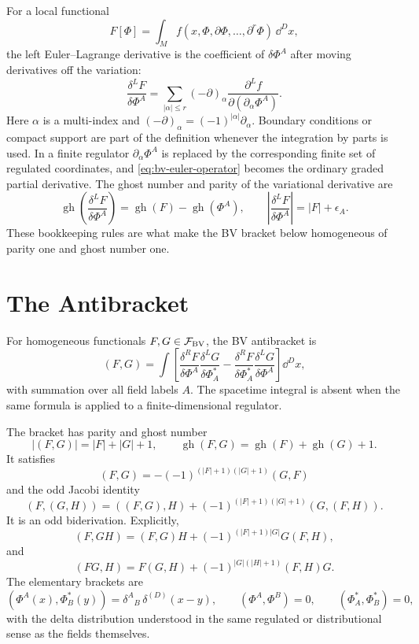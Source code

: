 For a local functional
\[
  F[\Phi]=\int_M f(x,\Phi,\partial\Phi,\ldots,\partial^r\Phi)\,\dd^D x ,
\]
the left Euler--Lagrange derivative is the coefficient of
\(\delta\Phi^A\) after moving derivatives off the variation:
\begin{equation}
  \frac{\delta^L F}{\delta\Phi^A}
  =
  \sum_{|\alpha|\leq r}
  (-\partial)_\alpha
  \frac{\partial^L f}
       {\partial(\partial_\alpha\Phi^A)} .
  \label{eq:bv-euler-operator}
\end{equation}
Here \(\alpha\) is a multi-index and
\((-\partial)_\alpha=(-1)^{|\alpha|}\partial_\alpha\).  Boundary conditions or
compact support are part of the definition whenever the integration by parts
is used.  In a finite regulator \(\partial_\alpha\Phi^A\) is replaced by the
corresponding finite set of regulated coordinates, and
\eqref{eq:bv-euler-operator} becomes the ordinary graded partial derivative.
The ghost number and parity of the variational derivative are
\[
  \operatorname{gh}\!\left(\frac{\delta^L F}{\delta\Phi^A}\right)
  =
  \operatorname{gh}(F)-\operatorname{gh}(\Phi^A),
  \qquad
  \left|\frac{\delta^L F}{\delta\Phi^A}\right|
  =
  |F|+\epsilon_A .
\]
These bookkeeping rules are what make the BV bracket below homogeneous of
parity one and ghost number one.

\section{The Antibracket}

\begin{definition}[BV antibracket]
For homogeneous functionals \(F,G\in\mathcal F_{\rm BV}\), the BV
antibracket is
\begin{equation}
  (F,G)
  =
  \int
  \left[
  \frac{\delta^R F}{\delta\Phi^A}
  \frac{\delta^L G}{\delta\Phi^*_A}
  -
  \frac{\delta^R F}{\delta\Phi^*_A}
  \frac{\delta^L G}{\delta\Phi^A}
  \right]\dd^D x ,
  \label{eq:bv-antibracket}
\end{equation}
with summation over all field labels \(A\).  The spacetime integral is absent
when the same formula is applied to a finite-dimensional regulator.
\end{definition}

The bracket has parity and ghost number
\[
  |(F,G)|=|F|+|G|+1,
  \qquad
  \operatorname{gh}(F,G)=\operatorname{gh}(F)+\operatorname{gh}(G)+1.
\]
It satisfies
\[
  (F,G)
  =
  -(-1)^{(|F|+1)(|G|+1)}(G,F)
\]
and the odd Jacobi identity
\[
  (F,(G,H))
  =
  ((F,G),H)
  +
  (-1)^{(|F|+1)(|G|+1)}(G,(F,H)).
\]
It is an odd biderivation.  Explicitly,
\[
  (F,GH)
  =
  (F,G)H
  +
  (-1)^{(|F|+1)|G|}G(F,H),
\]
and
\[
  (FG,H)
  =
  F(G,H)
  +
  (-1)^{|G|(|H|+1)}(F,H)G .
\]
The elementary brackets are
\[
  (\Phi^A(x),\Phi^*_B(y))=\delta^A{}_B\,\delta^{(D)}(x-y),
  \qquad
  (\Phi^A,\Phi^B)=0,
  \qquad
  (\Phi^*_A,\Phi^*_B)=0,
\]
with the delta distribution understood in the same regulated or distributional
sense as the fields themselves.

